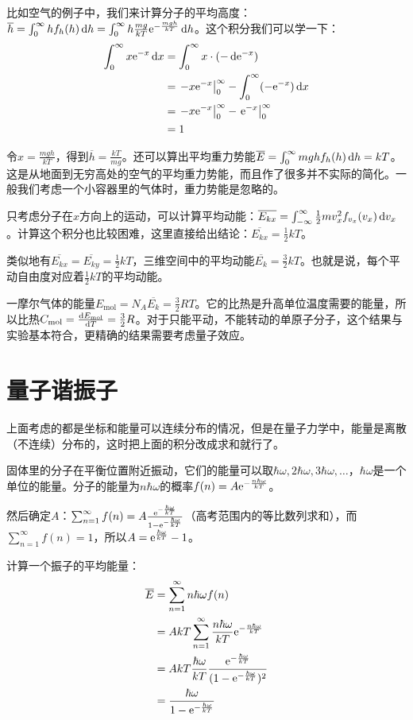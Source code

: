 比如空气的例子中，我们来计算分子的平均高度：$\overline{h}=\int_0^\infty h f_h(h) \mathop{}\!\mathrm{d} h=\int_0^\infty h \frac{m g}{k T} \mathrm{e}^{-\frac{m g h}{k T}} \mathop{}\!\mathrm{d} h$。这个积分我们可以学一下：
\begin{align*}
\int_0^\infty x \mathrm{e}^{-x} \mathop{}\!\mathrm{d} x&=\int_0^\infty x \cdot (-\mathop{}\!\mathrm{d} \mathrm{e}^{-x}) \\
&=\left. -x \mathrm{e}^{-x} \right|_0^\infty-\int_0^\infty (-\mathrm{e}^{-x}) \mathop{}\!\mathrm{d} x \\
&=\left. -x \mathrm{e}^{-x} \right|_0^\infty-\left. \mathrm{e}^{-x} \right|_0^\infty \\
&=1
\end{align*}

令$x=\frac{m g h}{k T}$，得到$\overline{h}=\frac{k T}{m g}$。还可以算出平均重力势能$\overline{E}=\int_0^\infty m g h f_h(h) \mathop{}\!\mathrm{d} h=k T$。这是从地面到无穷高处的空气的平均重力势能，而且作了很多并不实际的简化。一般我们考虑一个小容器里的气体时，重力势能是忽略的。

只考虑分子在$x$方向上的运动，可以计算平均动能：$\overline{E_{k x}}=\int_{-\infty}^\infty \frac{1}{2} m v_x^2 f_{v_x}(v_x) \mathop{}\!\mathrm{d} v_x$。计算这个积分也比较困难，这里直接给出结论：$\overline{E_{k x}}=\frac{1}{2} k T$。

类似地有$\overline{E_{k x}}=\overline{E_{k y}}=\frac{1}{2} k T$，三维空间中的平均动能$\overline{E_k}=\frac{3}{2} k T$。也就是说，每个平动自由度对应着$\frac{1}{2} k T$的平均动能。

一摩尔气体的能量$E_\text{mol}=N_A \overline{E_k}=\frac{3}{2} R T$。它的比热是升高单位温度需要的能量，所以比热$C_\text{mol}=\frac{\mathop{}\!\mathrm{d} E_\text{mol}}{\mathop{}\!\mathrm{d} T}=\frac{3}{2} R$。对于只能平动，不能转动的单原子分子，这个结果与实验基本符合，更精确的结果需要考虑量子效应。
\section{量子谐振子}
上面考虑的都是坐标和能量可以连续分布的情况，但是在量子力学中，能量是离散（不连续）分布的，这时把上面的积分改成求和就行了。

固体里的分子在平衡位置附近振动，它们的能量可以取$\hbar \omega,2 \hbar \omega,3 \hbar \omega,\dots$，$\hbar \omega$是一个单位的能量。分子的能量为$n \hbar \omega$的概率$f(n)=A \mathrm{e}^{-\frac{n \hbar \omega}{k T}}$。

然后确定$A$：$\sum_{n=1}^\infty f(n)=A \frac{\mathrm{e}^{-\frac{\hbar \omega}{k T}}}{1-\mathrm{e}^{-\frac{\hbar \omega}{k T}}}$（高考范围内的等比数列求和），而$\sum_{n=1}^\infty f(n)=1$，所以$A=\mathrm{e}^{\frac{\hbar \omega}{k T}}-1$。

计算一个振子的平均能量：
\begin{align*}
\overline{E}&=\sum_{n=1}^\infty n \hbar \omega f(n) \\
&=A k T \sum_{n=1}^\infty \frac{n \hbar \omega}{k T} \mathrm{e}^{-\frac{n \hbar \omega}{k T}} \\
&=A k T \frac{\hbar \omega}{k T} \frac{\mathrm{e}^{-\frac{\hbar \omega}{k T}}}{(1-\mathrm{e}^{-\frac{\hbar \omega}{k T}})^2} \\
&=\frac{\hbar \omega}{1-\mathrm{e}^{-\frac{\hbar \omega}{k T}}}
\end{align*}

